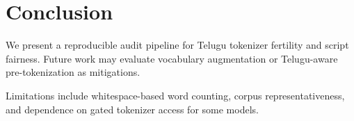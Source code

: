 \section{Conclusion}

We present a reproducible audit pipeline for Telugu tokenizer fertility and
script fairness. Future work may evaluate vocabulary augmentation or
Telugu-aware pre-tokenization as mitigations.

Limitations include whitespace-based word counting, corpus representativeness,
and dependence on gated tokenizer access for some models.
